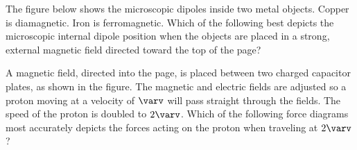 \documentclass{../../oss-classkick-exam}
\begin{document}
\begin{multicols*}{2}
\begin{questions}

  \item The figure below shows the microscopic dipoles inside two metal objects.
    Copper is diamagnetic. Iron is ferromagnetic. Which of the following
    best depicts the microscopic internal dipole position when the objects
    are placed in a strong, external magnetic field directed toward the top
    of the page?
    \begin{center}

    \end{center}
    \columnbreak
    
    \question A magnetic field, directed into the page, is placed between two
    charged capacitor plates, as shown in the figure. The magnetic and electric
    fields are adjusted so a proton moving at a velocity of $\varv$ will pass
    straight through the fields. The speed of the proton is doubled to $2\varv$.
    Which of the following force diagrams most accurately depicts the forces
    acting on the proton when traveling at $2\varv$?
    \begin{center}
    \end{center}
    \begin{choices}
      \choice
      

\end{choices}
\end{questions}
\end{multicols*}
\end{document}
